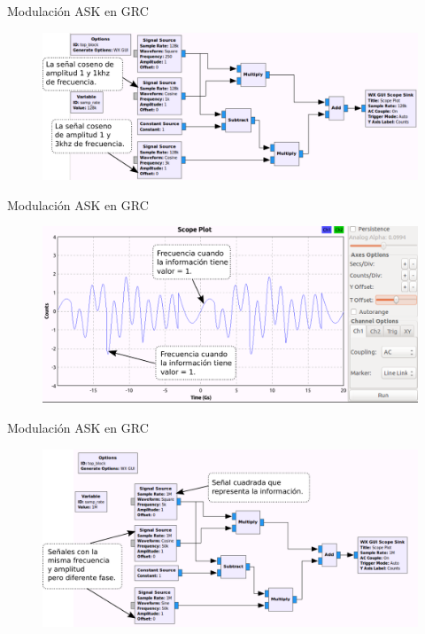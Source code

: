 \begin{frame}{Modulación ASK en GRC}
\begin{figure}[H]
\centering
\includegraphics[width=\textwidth]{lab4/pdf/lab4_3.pdf}
\end{figure}
\end{frame}

\begin{frame}{Modulación ASK en GRC}
\begin{figure}[H]
\centering
\includegraphics[width=\textwidth]{lab4/pdf/lab4_4.pdf}
\end{figure}
\end{frame}

\begin{frame}{Modulación ASK en GRC}
\begin{figure}[H]
\centering
\includegraphics[width=\textwidth]{lab4/pdf/lab4_5.pdf}
\end{figure}
\end{frame}

